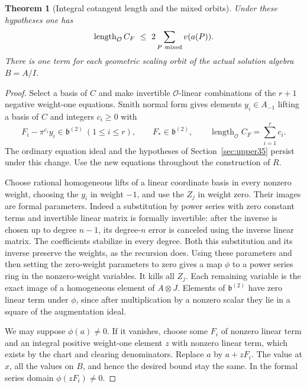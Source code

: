 \documentclass[a4paper,11pt]{article}
\newtheorem{theorem}[proposition]{Theorem}
\theoremstyle{definition}
\theoremstyle{remark}
\newcommand{\len}{\operatorname{length}}\newcommand{\Res}{\operatorname*{Res}}
\numberwithin{equation}{section}
\newcommand{\OO}{\mathcal O}
\begin{document}
\begin{theorem}[Integral cotangent length and the mixed orbits]\label{thm:full36}
Under these hypotheses one has
\begin{equation}
                \len_{\OO}C_F\ \le\ 2\sum_{P\ {\rm mixed}}v(a(P)).
                                                               \label{eq:full36}
\end{equation}
There is one term for each geometric scaling orbit of the actual solution algebra \(B=A/I\).
\end{theorem}
\begin{proof}
Select a basis of \(C\) and make invertible \(\OO\)-linear combinations of the \(r+1\) negative weight-one equations. Smith normal form gives elements \(y_i\in A_{-1}\) lifting a basis of \(C\) and integers \(c_i\ge0\) with
\[
 F_i-\pi^{c_i}y_i\in\mathfrak b^{(2)}\ (1\le i\le r),\qquad
 F_*\in\mathfrak b^{(2)},\qquad \len_{\OO} C_F=\sum_{i=1}^r c_i .
\]
The ordinary equation ideal and the hypotheses of Section~\ref{sec:upper35} persist under this change. Use the new equations throughout the construction of \(R\).

Choose rational homogeneous lifts of a linear coordinate basis in every nonzero weight, choosing the \(y_i\) in weight \(-1\), and use the \(Z_j\) in weight zero. Their images are formal parameters. Indeed a substitution by power series with zero constant terms and invertible linear matrix is formally invertible: after the inverse is chosen up to degree \(n-1\), its degree-\(n\) error is canceled using the inverse linear matrix. The coefficients stabilize in every degree. Both this substitution and its inverse preserve the weights, as the recursion does. Using these parameters and then setting the zero-weight parameters to zero gives a map \(\phi\) to a power series ring in the nonzero-weight variables. It kills all \(Z_j\). Each remaining variable is the exact image of a homogeneous element of \(A\otimes J\). Elements of \(\mathfrak b^{(2)}\) have zero linear term under \(\phi\), since after multiplication by a nonzero scalar they lie in a square of the augmentation ideal.

We may suppose \(\phi(a)\ne0\). If it vanishes, choose some \(F_i\) of nonzero linear term and an integral positive weight-one element \(z\) with nonzero linear term, which exists by the chart and clearing denominators. Replace \(a\) by \(a+zF_i\). The value at \(x\), all the values on \(B\), and hence the desired bound stay the same. In the formal series domain \(\phi(zF_i)\ne0\).


\end{proof}
\end{document}

